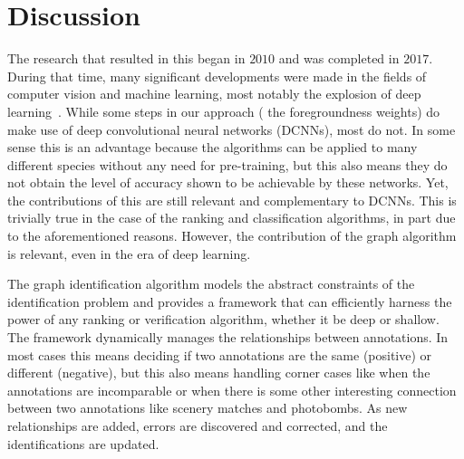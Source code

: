     \section{Discussion}\label{sec:discuss}

    The research that resulted in this \thesis{} began in $2010$ and was completed in $2017$.
    During that time, many significant developments were made in the fields of computer vision and machine
      learning, most notably the explosion of deep learning~\cite{lecun_deep_2015}.
    While some steps in our approach (\eg{} the foregroundness weights) do make use of deep convolutional neural
      networks (DCNNs), most do not.
    In some sense this is an advantage because the algorithms can be applied to many different species without
      any need for pre-training, but this also means they do not obtain the level of accuracy shown to be
      achievable by these networks.
    Yet, the contributions of this \thesis{} are still relevant and complementary to DCNNs.
    This is trivially true in the case of the ranking and classification algorithms, in part due to the
      aforementioned reasons.
    However, the contribution of the graph algorithm is relevant, even in the era of deep learning.
    
    The graph identification algorithm models the abstract constraints of the identification problem and provides
      a framework that can efficiently harness the power of any ranking or verification algorithm, whether it be
      deep or shallow.
    The framework dynamically manages the relationships between annotations.
    In most cases this means deciding if two annotations are the same (positive) or different (negative), but
      this also means handling corner cases like when the annotations are incomparable or when there is some other
      interesting connection between two annotations like scenery matches and photobombs.
    As new relationships are added, errors are discovered and corrected, and the identifications are updated.


